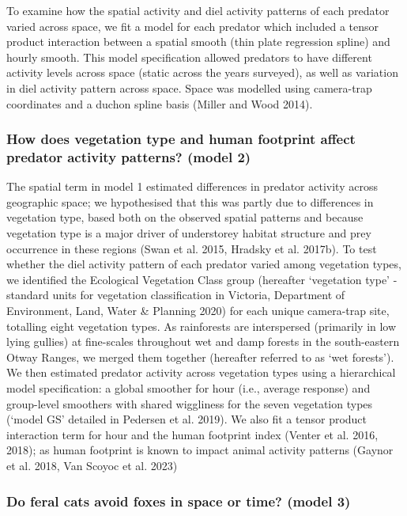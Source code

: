 \documentclass[preprint, 3p, authoryear]{elsarticle} %
\begin{document}
To examine how the spatial activity and diel activity patterns of each predator varied across space, we fit a model for each predator which included a tensor product interaction between a spatial smooth (thin plate regression spline) and hourly smooth. This model specification allowed predators to have different activity levels across space (static across the years surveyed), as well as variation in diel activity pattern across space. Space was modelled using camera-trap coordinates and a duchon spline basis (Miller and Wood 2014).

\hypertarget{how-does-vegetation-type-and-human-footprint-affect-predator-activity-patterns-model-2}{%
\subsubsection{How does vegetation type and human footprint affect predator activity patterns? (model 2)}\label{how-does-vegetation-type-and-human-footprint-affect-predator-activity-patterns-model-2}}

The spatial term in model 1 estimated differences in predator activity across geographic space; we hypothesised that this was partly due to differences in vegetation type, based both on the observed spatial patterns and because vegetation type is a major driver of understorey habitat structure and prey occurrence in these regions (Swan et al. 2015, Hradsky et al. 2017b). To test whether the diel activity pattern of each predator varied among vegetation types, we identified the Ecological Vegetation Class group (hereafter `vegetation type' - standard units for vegetation classification in Victoria, Department of Environment, Land, Water \& Planning 2020) for each unique camera-trap site, totalling eight vegetation types. As rainforests are interspersed (primarily in low lying gullies) at fine-scales throughout wet and damp forests in the south-eastern Otway Ranges, we merged them together (hereafter referred to as `wet forests'). We then estimated predator activity across vegetation types using a hierarchical model specification: a global smoother for hour (i.e., average response) and group-level smoothers with shared wiggliness for the seven vegetation types (`model GS' detailed in Pedersen et al. 2019). We also fit a tensor product interaction term for hour and the human footprint index (Venter et al. 2016, 2018); as human footprint is known to impact animal activity patterns (Gaynor et al. 2018, Van Scoyoc et al. 2023)

\hypertarget{do-feral-cats-avoid-foxes-in-space-or-time-model-3}{%
\subsubsection{Do feral cats avoid foxes in space or time? (model 3)}\label{do-feral-cats-avoid-foxes-in-space-or-time-model-3}}
\end{document}
